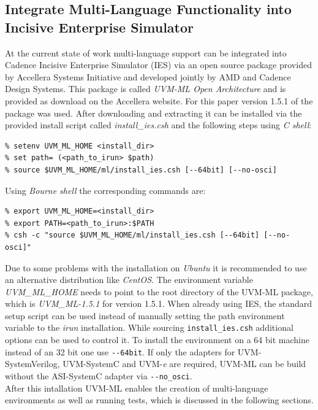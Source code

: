 \subsection{Integrate Multi-Language Functionality into Incisive Enterprise
Simulator}
At the current state of work multi-language support can be integrated into Cadence Incisive Enterprise Simulator (IES)
via an open source package provided by Accellera Systems Initiative and developed jointly by AMD and Cadence Design
Systems. This package is called \emph{UVM-ML Open Architecture} and is provided as download on the Accellera website.
For this paper version 1.5.1 of the package was used. After downloading and extracting it can be
installed via the provided install script called \emph{install\_ies.csh} and the following steps using \emph{C shell}:

\medskip
{}
\begin{lstlisting}
% setenv UVM_ML_HOME <install_dir>
% set path= (<path_to_irun> $path)
% source $UVM_ML_HOME/ml/install_ies.csh [--64bit] [--no-osci]
\end{lstlisting} 
\medskip 

Using \emph{Bourne shell} the corresponding commands are:

\medskip
{}
\begin{lstlisting}
% export UVM_ML_HOME=<install_dir>
% export PATH=<path_to_irun>:$PATH
% csh -c "source $UVM_ML_HOME/ml/install_ies.csh [--64bit] [--no-osci]"
\end{lstlisting} 
\medskip 

Due to some problems with the installation on \emph{Ubuntu} it is recommended to use an alternative distribution like
\emph{CentOS}. The environment variable \emph{UVM\_ML\_HOME} needs to point to the root directory of the UVM-ML
package, which is \emph{UVM\_ML-1.5.1} for version 1.5.1. When already using IES, the standard setup script can be used
instead of manually setting the path environment variable to the \emph{irun} installation. While sourcing
\lstinline$install_ies.csh$ additional options can be used to control it. To install the environment on a 64 bit machine
instead of an 32 bit one use \lstinline$--64bit$. If only the adapters for UVM-SystemVerilog, UVM-SystemC and
UVM-\textit{e} are required, UVM-ML can be build without the ASI-SystemC adapter via \lstinline$--no_osci$.\\
After this intallation UVM-ML enables the creation of multi-language environments as well as running tests, which is
discussed in the following sections.

